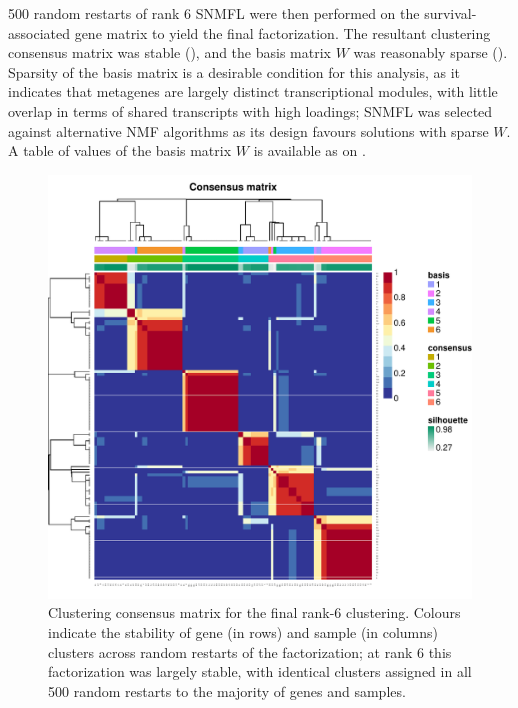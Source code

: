 \documentclass[dissertation.tex]{subfiles}
\begin{document}
500 random restarts of rank 6 \gls{SNMFL} were then performed on the survival-associated gene matrix to yield the final factorization.  The resultant clustering consensus matrix was stable (), and the basis matrix $W$ was reasonably sparse ().  Sparsity of the basis matrix is a desirable condition for this analysis, as it indicates that metagenes are largely distinct transcriptional modules, with little overlap in terms of shared transcripts with high loadings; \gls{SNMFL} was selected against alternative \gls{NMF} algorithms as its design favours solutions with sparse $W$.  A table of values of the basis matrix $W$ is available as  on .

\begin{figure}
\centering
\includegraphics[width=.7\linewidth]{analysis/biosurv/reports/18_SIS_diag_dsd_final/figure/nmf-plots-1}
\caption[Consensus matrix for the final rank-6 clustering]{Clustering consensus matrix for the final rank-6 clustering.  Colours indicate the stability of gene (in rows) and sample (in columns) clusters across random restarts of the factorization; at rank 6 this factorization was largely stable, with identical clusters assigned in all 500 random restarts to the majority of genes and samples.}\label{fig:sigs-nmf-consensus}
\end{figure}
\end{document}
